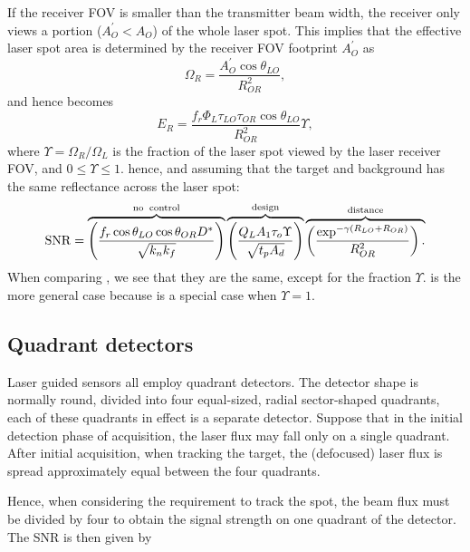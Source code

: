 If the receiver FOV is smaller than the transmitter beam width, the receiver only views a portion ($A_O^\prime<A_O$) of the whole laser spot. This implies that the effective laser spot area is determined by the receiver FOV footprint  $A_O^\prime$ as 
\begin{equation}
\Omega_R=\frac{A_O^\prime\cos\theta_{LO}}{R^2_{OR}},
\label{eq:lrfFOVsmaller}
\end{equation}
and hence  becomes
\begin{equation}
E_R = \frac{
f_r \Phi_L \tau_{LO}\tau_{OR} \cos\theta_{LO}}{R^2_{OR} }\Upsilon , %
\label{lrfi2}
\end{equation}
where $\Upsilon =\Omega_R/\Omega_L$ is the fraction of the laser spot
viewed by the laser receiver FOV, and $0\leq\Upsilon\leq 1$. 
hence, and assuming that the target and background has the same reflectance across the laser spot:
\begin{equation}
\operatorname{SNR}=
\overbrace{
\left(\frac{f_r  \cos\theta_{LO} \cos\theta_{OR} D^\ast }{\sqrt{k_nk_f}}\right)
}^{\rm no\;\;control}
\overbrace{
\left(\frac{Q_L A_1 \tau_o \Upsilon}{\sqrt{t_p A_d}}\right)
}^{\rm design}
\overbrace{
\left(\frac{\exp^{-\gamma (R_{LO}+R_{OR})} }{R^2_{OR}}\right).\\
}^{\rm distance}
\label{lrfd2e}
\end{equation}
When comparing
, we see that they are the same, except
for the fraction $\Upsilon$.  is the more general case
because  is a special case when $\Upsilon=1$.



\subsection{Quadrant detectors}
\noindent
Laser guided sensors all employ quadrant detectors.  The detector shape is normally round, divided into four equal-sized, radial sector-shaped quadrants, each of these quadrants in effect is a separate detector. Suppose that in the initial detection phase of acquisition, the laser flux may fall only on a single quadrant.  After initial acquisition, when tracking the target, the (defocused) laser flux is spread approximately equal between the four quadrants.

Hence, when considering the requirement to track the spot, the beam flux must be divided by four to obtain the signal strength on one quadrant of the detector. The SNR is then given by


